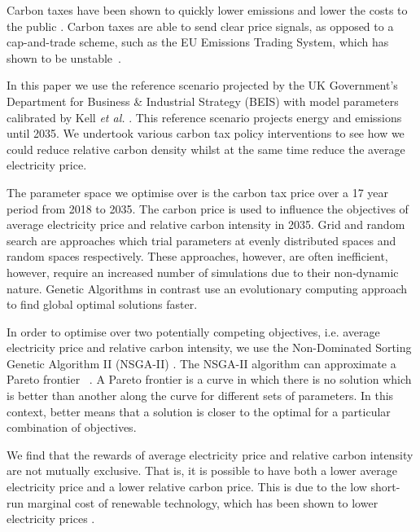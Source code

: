 \documentclass[sigconf]{acmart}
\begin{document}
Carbon taxes have been shown to quickly lower emissions and lower the costs to the public \cite{Wittneben2009}. Carbon taxes are able to send clear price signals, as opposed to a cap-and-trade scheme, such as the EU Emissions Trading System, which has shown to be unstable~\cite{Wittneben2009}.

In this paper we use the reference scenario projected by the UK Government's Department for Business \& Industrial Strategy (BEIS) with model parameters calibrated by Kell \textit{et al.} \cite{DBEIS2019,Kell2020}. This reference scenario projects energy and emissions until 2035. We undertook various carbon tax policy interventions to see how we could reduce relative carbon density whilst at the same time reduce the average electricity price.


The parameter space we optimise over is the carbon tax price over a 17 year period from 2018 to 2035. The carbon price is used to influence the objectives of average electricity price and relative carbon intensity in 2035. Grid and random search are approaches which trial parameters at evenly distributed spaces and random spaces respectively. These approaches, however, are often inefficient, however, require an increased number of simulations due to their non-dynamic nature. Genetic Algorithms in contrast use an evolutionary computing approach to find global optimal solutions faster.


In order to optimise over two potentially competing objectives, i.e. average electricity price and relative carbon intensity, we use the Non-Dominated Sorting Genetic Algorithm II (NSGA-II) \cite{Valkanas2014}. The NSGA-II algorithm can approximate a Pareto frontier ~\cite{Pareto1927, Stadler1979}. A Pareto frontier is a curve in which there is no solution which is better than another along the curve for different sets of parameters. In this context, better means that a solution is closer to the optimal for a particular combination of objectives.

We find that the rewards of average electricity price and relative carbon intensity are not mutually exclusive. That is, it is possible to have both a lower average electricity price and a lower relative carbon price. This is due to the low short-run marginal cost of renewable technology, which has been shown to lower electricity prices \cite{OMahoney2011}.
\end{document}
